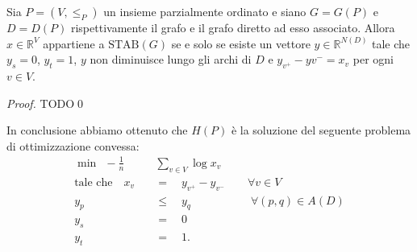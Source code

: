 \begin{lemma}
  Sia \(P=(V,\le_{P})\) un insieme parzialmente ordinato e siano \(G=G(P)\) e \(D=D(P)\) rispettivamente il grafo e il grafo diretto ad esso associato. Allora \(x\in\mathbb{R}^V\) appartiene a \(\text{STAB}(G)\) se e solo se esiste un vettore \(y\in \mathbb{R}^{N(D)}\) tale che \(y_s=0\), \(y_t=1\), \(y\) non diminuisce lungo gli archi di \(D\) e \(y_{v^+}-y{v^-}=x_v\) per ogni \(v\in V\).
\end{lemma}
\begin{proof}
  TODO\qed
\end{proof}

In conclusione abbiamo ottenuto che \(H(P)\) è la soluzione del seguente problema di ottimizzazione convessa:
\begin{align}
  \min\;\,-\frac{1}{n}&\sum_{v\in V}{\log{x_v}} \nonumber \\
  \text{tale che}\quad x_v\quad &=\quad y_{v^+} - y_{v^-}\qquad\forall v\in V\nonumber \\
  y_p\quad &\le\quad y_q \qquad\qquad\quad\;\forall (p,q)\in A(D)\nonumber \\
  y_s\quad &=\quad 0 \nonumber \\
  y_t\quad &=\quad 1\text{.} \nonumber
\end{align}

